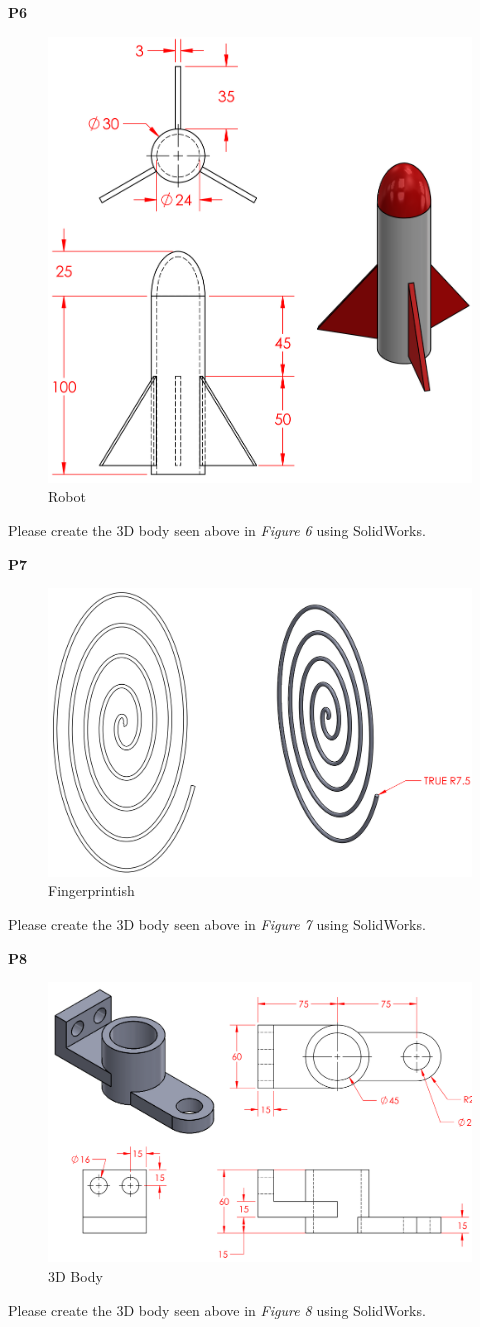 \documentclass{article}
\begin{document}
{%
\textbf{P6}
\begin{figure}[H]
  \centering
  \includegraphics[width=.475\linewidth]{images/6.png}  
  \caption{Robot}
  \label{fig:6}
\end{figure}
\noindent Please create the 3D body seen above in \textit{Figure 6} using SolidWorks.

\textbf{P7}
\begin{figure}[H]
  \centering
  \includegraphics[width=.725\linewidth]{images/7.png}  
  \caption{Fingerprintish}
  \label{fig:7}
\end{figure}
\noindent Please create the 3D body seen above in \textit{Figure 7} using SolidWorks.

\textbf{P8}
\begin{figure}[H]
  \centering
  \includegraphics[width=.75\linewidth]{images/8.png}  
  \caption{3D Body}
  \label{fig:8}
\end{figure}
\noindent Please create the 3D body seen above in \textit{Figure 8} using SolidWorks.

}
\end{document}
